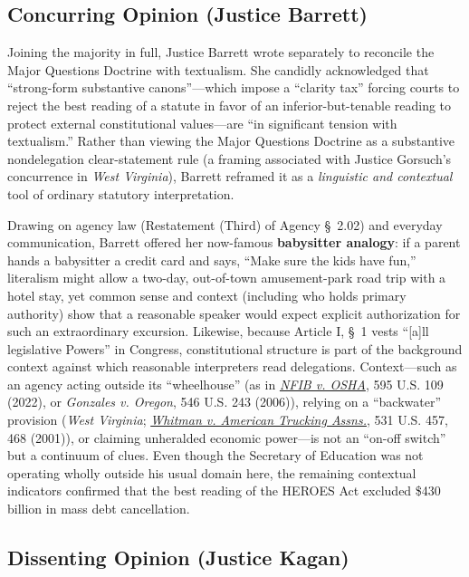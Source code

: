 \documentclass[12pt]{article}
\begin{document}
\subsection{Concurring Opinion (Justice Barrett)}

Joining the majority in full, Justice Barrett wrote separately to reconcile the Major Questions Doctrine with textualism. She candidly acknowledged that ``strong-form substantive canons''---which impose a ``clarity tax'' forcing courts to reject the best reading of a statute in favor of an inferior-but-tenable reading to protect external constitutional values---are ``in significant tension with textualism.'' Rather than viewing the Major Questions Doctrine as a substantive nondelegation clear-statement rule (a framing associated with Justice Gorsuch's concurrence in \textit{West Virginia}), Barrett reframed it as a \textit{linguistic and contextual} tool of ordinary statutory interpretation.

Drawing on agency law (Restatement (Third) of Agency \S~2.02) and everyday communication, Barrett offered her now-famous \textbf{babysitter analogy}: if a parent hands a babysitter a credit card and says, ``Make sure the kids have fun,'' literalism might allow a two-day, out-of-town amusement-park road trip with a hotel stay, yet common sense and context (including who holds primary authority) show that a reasonable speaker would expect explicit authorization for such an extraordinary excursion. Likewise, because Article I, \S~1 vests ``[a]ll legislative Powers'' in Congress, constitutional structure is part of the background context against which reasonable interpreters read delegations. Context---such as an agency acting outside its ``wheelhouse'' (as in \href{https://supreme.justia.com/cases/federal/us/595/21a244/}{\textit{NFIB v. OSHA}}, 595 U.S. 109 (2022), or \textit{Gonzales v. Oregon}, 546 U.S. 243 (2006)), relying on a ``backwater'' provision (\textit{West Virginia}; \href{https://supreme.justia.com/cases/federal/us/531/457/}{\textit{Whitman v. American Trucking Assns.}}, 531 U.S. 457, 468 (2001)), or claiming unheralded economic power---is not an ``on-off switch'' but a continuum of clues. Even though the Secretary of Education was not operating wholly outside his usual domain here, the remaining contextual indicators confirmed that the best reading of the HEROES Act excluded \$430 billion in mass debt cancellation.

\subsection{Dissenting Opinion (Justice Kagan)}
\end{document}
